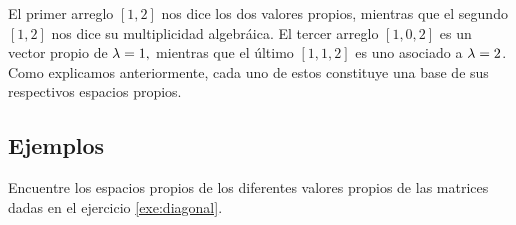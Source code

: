 El primer arreglo $[1,2]$ nos dice los dos valores propios, mientras que el segundo $[1,2]$ nos dice su multiplicidad
algebráica. El tercer arreglo $[1,0,2]$ es un vector propio de $\lambda=1,$ mientras que el último $[1,1,2]$ es uno
asociado a $\lambda=2$. Como explicamos anteriormente, cada uno de estos constituye una base de sus respectivos espacios
propios.

\subsection*{Ejemplos}

\begin{resuelto}
 Encuentre los espacios propios de los diferentes valores propios de las matrices dadas en el ejercicio
 \ref{exe:diagonal}.
\end{resuelto}

